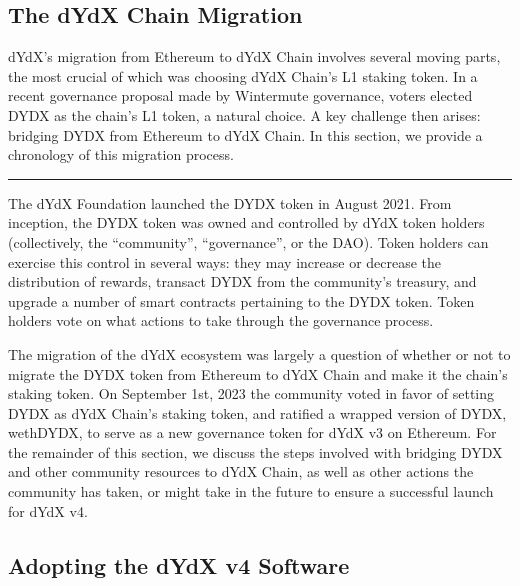 \begin{fullwidth}
    \section{The dYdX Chain Migration} \label{sec:migration}

    \begin{adjustwidth}{2cm}{2cm}
        \justify
        dYdX's migration from Ethereum to dYdX Chain involves several moving parts, the most crucial of which was choosing dYdX Chain's L1 staking token. In a recent governance proposal made by Wintermute governance, voters elected DYDX as the chain's L1 token, a natural choice. A key challenge then arises: bridging DYDX from Ethereum to dYdX Chain. In this section, we provide a chronology of this migration process.
    \end{adjustwidth}
    
    \textcolor{gray}{\rule{\linewidth}{0.1mm}}
    
\end{fullwidth}

    The dYdX Foundation launched the DYDX token in August 2021. From inception, the DYDX token was owned and controlled by dYdX token holders (collectively, the ``community'', ``governance'', or the DAO). Token holders can exercise this control in several ways: they may increase or decrease the distribution of rewards, transact DYDX from the community's treasury, and upgrade a number of smart contracts pertaining to the DYDX token. Token holders vote on what actions to take through the governance process. 

    The migration of the dYdX ecosystem was largely a question of whether or not to migrate the DYDX token from Ethereum to dYdX Chain and make it the chain's staking token. On September 1st, 2023 the community voted in favor of setting DYDX as dYdX Chain's staking token, and ratified a wrapped version of DYDX, wethDYDX, to serve as a new governance token for dYdX v3 on Ethereum. For the remainder of this section, we discuss the steps involved with bridging DYDX and other community resources to dYdX Chain, as well as other actions the community has taken, or might take in the future to ensure a successful launch for dYdX v4.

    \subsection{Adopting the dYdX v4 Software}


